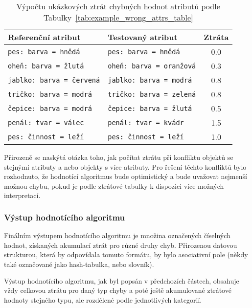 \begin{table}[H]
	\centering
	\begin{tabular}{|l|l|c|}
		\hline
		\textbf{Referenční atribut}      & \textbf{Testovaný atribut}      & \textbf{Ztráta} \\
		\hline
		\texttt{pes: barva = hnědá}      & \texttt{pes: barva = hnědá}     & 0.0             \\
		\texttt{oheň: barva = žlutá}     & \texttt{oheň: barva = oranžová} & 0.3             \\
		\texttt{jablko: barva = červená} & \texttt{jablko: barva = modrá}  & 0.8             \\
		\texttt{tričko: barva = modrá}   & \texttt{tričko: barva = zelená} & 0.8             \\
		\texttt{čepice: barva = modrá}   & \texttt{čepice: barva = žlutá}  & 0.5             \\
		\texttt{penál: tvar = válec}     & \texttt{penál: tvar = kvádr }   & 1.5             \\
		\texttt{pes: činnost = leží}     & \texttt{pes: činnost = leží }   & 1.0             \\
		\hline
	\end{tabular}
	\caption{Výpočtu ukázkových ztrát chybných hodnot atributů podle Tabulky~\ref{tab:example_wrong_attrs_table}}\label{tab:example_wrong_attrs_values}
\end{table}

Přirozeně se naskýtá otázka toho, jak počítat ztrátu při konfliktu objektů se stejnými atributy a nebo objekty s více atributy.
Pro řešení těchto konfliktů bylo rozhodnuto, že hodnotící algoritmus bude optimistický a bude uvažovat nejmenší možnou chybu,
pokud je podle ztrátové tabulky k dispozici více možných interpretací.

\subsubsection{Výstup hodnotícího algoritmu}
Finálním výstupem hodnotícího algoritmu je množina označených číselných hodnot, získaných akumulací ztrát pro různé druhy chyb.
Přirozenou datovou strukturou, která by odpovídala tomuto formátu, by bylo asociativní pole (někdy také označované jako hash-tabulka, nebo slovník).

Výstup hodnotícího algoritmu, jak byl popsán v předchozích částech, obsahuje vždy celkovou ztrátu pro daný typ chyby
a poté ještě akumulované ztrátové hodnoty stejného typu, ale rozdělené podle jednotlivých kategorií.

